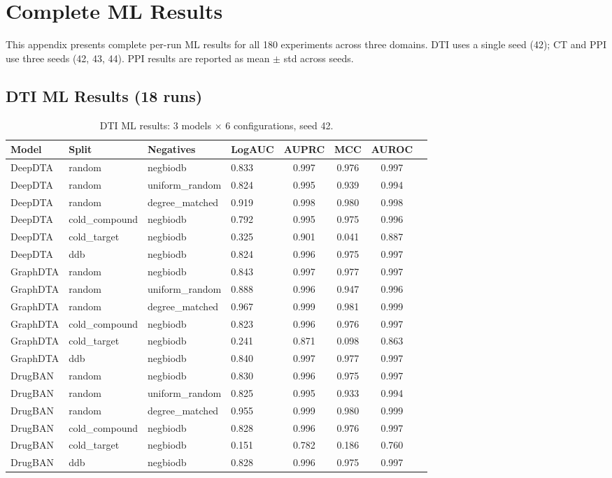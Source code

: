 \section{Complete ML Results}
\label{app:ml_tables}

This appendix presents complete per-run ML results for all 180 experiments across three domains. DTI uses a single seed (42); CT and PPI use three seeds (42, 43, 44). PPI results are reported as mean $\pm$ std across seeds.

\subsection{DTI ML Results (18 runs)}

\begin{table}[h]
\centering
\caption{DTI ML results: 3 models $\times$ 6 configurations, seed 42.}
\label{tab:dti_ml_full}
\scriptsize
\begin{tabular}{@{}llllcccc@{}}
\toprule
\textbf{Model} & \textbf{Split} & \textbf{Negatives} & \textbf{LogAUC} & \textbf{AUPRC} & \textbf{MCC} & \textbf{AUROC} \\
\midrule
DeepDTA & random & negbiodb & 0.833 & 0.997 & 0.976 & 0.997 \\
DeepDTA & random & uniform\_random & 0.824 & 0.995 & 0.939 & 0.994 \\
DeepDTA & random & degree\_matched & 0.919 & 0.998 & 0.980 & 0.998 \\
DeepDTA & cold\_compound & negbiodb & 0.792 & 0.995 & 0.975 & 0.996 \\
DeepDTA & cold\_target & negbiodb & 0.325 & 0.901 & 0.041 & 0.887 \\
DeepDTA & ddb & negbiodb & 0.824 & 0.996 & 0.975 & 0.997 \\
\midrule
GraphDTA & random & negbiodb & 0.843 & 0.997 & 0.977 & 0.997 \\
GraphDTA & random & uniform\_random & 0.888 & 0.996 & 0.947 & 0.996 \\
GraphDTA & random & degree\_matched & 0.967 & 0.999 & 0.981 & 0.999 \\
GraphDTA & cold\_compound & negbiodb & 0.823 & 0.996 & 0.976 & 0.997 \\
GraphDTA & cold\_target & negbiodb & 0.241 & 0.871 & 0.098 & 0.863 \\
GraphDTA & ddb & negbiodb & 0.840 & 0.997 & 0.977 & 0.997 \\
\midrule
DrugBAN & random & negbiodb & 0.830 & 0.996 & 0.975 & 0.997 \\
DrugBAN & random & uniform\_random & 0.825 & 0.995 & 0.933 & 0.994 \\
DrugBAN & random & degree\_matched & 0.955 & 0.999 & 0.980 & 0.999 \\
DrugBAN & cold\_compound & negbiodb & 0.828 & 0.996 & 0.976 & 0.997 \\
DrugBAN & cold\_target & negbiodb & 0.151 & 0.782 & 0.186 & 0.760 \\
DrugBAN & ddb & negbiodb & 0.828 & 0.996 & 0.975 & 0.997 \\
\bottomrule
\end{tabular}
\end{table}


